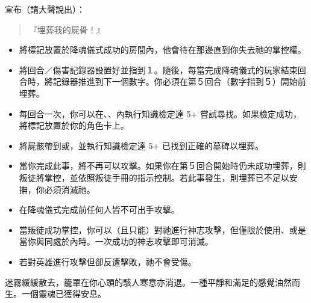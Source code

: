 宣布（請大聲說出）：
\begin{quote}
	『埋葬我的屍骨！』
\end{quote}
\vspace*{-1em}
\begin{itemize}
	\item 將標記放置於降魂儀式成功的房間內，他會待在那邊直到你失去祂的掌控權。
	\item 將回合／傷害記錄器設置好並指到１。隨後，每當完成降魂儀式的玩家結束回合時，將記錄器推進到下一個數字。你必須在第５回合（數字指到５）開始前埋葬。
	\item 每回合一次，你可以在、、內執行知識檢定達 5+ 嘗試尋找。如果檢定成功，將標記放置於你的角色卡上。
	\item 將屍骸帶到或，並執行知識檢定達 5+ 已找到正確的墓碑以埋葬。
	\item 當你完成此事，將不再可以攻擊。如果你在第５回合開始時仍未成功埋葬，則叛徒將掌控，並依照叛徒手冊的指示控制。若此事發生，則埋葬已不足以安撫，你必須消滅祂。
\end{itemize}

\vspace*{-1em}
\begin{itemize}
	\item 在降魂儀式完成前任何人皆不可出手攻擊。
	\item 當叛徒成功掌控，你可以（且只能）對祂進行神志攻擊，但僅限於使用、或是當你與同處於內時。一次成功的神志攻擊即可消滅。
	\item 若對英雄進行攻擊但卻反遭擊敗，祂不會受傷。
\end{itemize}

\begin{HauntStory}
	迷霧緩緩散去，籠罩在你心頭的駭人寒意亦消退。一種平靜和滿足的感覺油然而生。一個靈魂已獲得安息。
\end{HauntStory}

